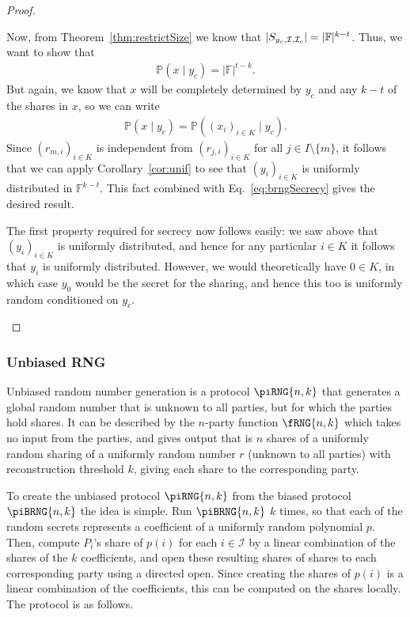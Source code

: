 \documentclass{article}
\theoremstyle{remark}
\newcommand{\F}{\mathbb{F}}
\renewcommand{\P}{\mathbb{P}}
\begin{document}
\begin{proof}
\begin{itemize}
			Now, from Theorem~\ref{thm:restrictSize} we know that
			$|\shareRestrict{y_c}{\mathcal{I}}{\mathcal{I}_c}| = |\F|^{k-t}$.
			Thus, we want to show that
			\begin{align*}
				\P(x \mid y_c) = |\F|^{t-k}.
			\end{align*}
			But again, we know that $x$ will be completely determined by $y_c$
			and any $k-t$ of the shares in $x$, so we can write
			\begin{align}\label{eq:brngSecrecy}
				\P(x \mid y_c) = \P({(x_i)}_{i \in K} \mid y_c).
			\end{align}
			Since ${(r_{m, i})}_{i \in K}$ is independent from ${(r_{j, i})}_{i
			\in K}$ for all $j \in I \setminus \{m\}$, it follows that we can
			apply Corollary~\ref{cor:unif} to see that ${(y_i)}_{i \in K}$ is
			uniformly distributed in $\F^{k-t}$. This fact combined with
			Eq.~\eqref{eq:brngSecrecy} gives the desired result.

			The first property required for secrecy now follows easily: we saw
			above that ${(y_i)}_{i \in K}$ is uniformly distributed, and hence
			for any particular $i \in K$ it follows that $y_i$ is uniformly
			distributed. However, we would theoretically have $0 \in K$, in
			which case $y_0$ would be the secret for the sharing, and hence
			this too is uniformly random conditioned on $y_c$.
	\end{itemize}
\end{proof}

\subsubsection{Unbiased RNG}

Unbiased random number generation is a protocol $\piRNG{n,k}$ that generates a
global random number that is unknown to all parties, but for which the parties
hold shares. It can be described by the $n$-party function $\fRNG{n,k}$ which
takes no input from the parties, and gives output that is $n$ shares of a
uniformly random sharing of a uniformly random number $r$ (unknown to all
parties) with reconstruction threshold $k$, giving each share to the
corresponding party.

To create the unbiased protocol $\piRNG{n,k}$ from the biased protocol
$\piBRNG{n,k}$ the idea is simple. Run $\piBRNG{n,k}$ $k$ times, so that each
of the random secrets represents a coefficient of a uniformly random polynomial
$p$. Then, compute $P_i$'s share of $p(i)$ for each $i \in \mathcal{I}$ by a
linear combination of the shares of the $k$ coefficients, and open these
resulting shares of shares to each corresponding party using a directed open.
Since creating the shares of $p(i)$ is a linear combination of the
coefficients, this can be computed on the shares locally. The protocol is as
follows.
\end{document}
